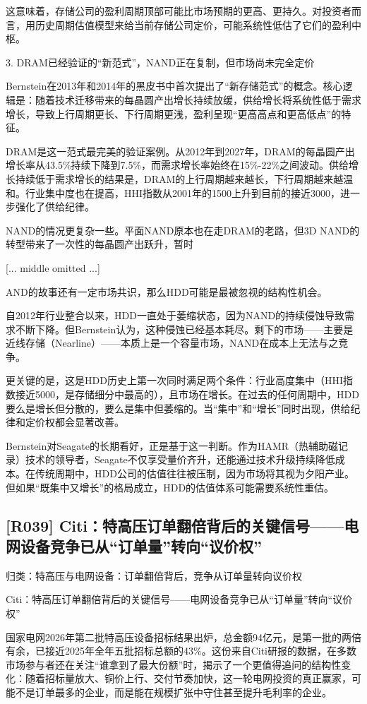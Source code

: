 \documentclass[11pt]{ctexart}
\begin{document}
这意味着，存储公司的盈利周期顶部可能比市场预期的更高、更持久。对投资者而言，用历史周期估值模型来给当前存储公司定价，可能系统性低估了它们的盈利中枢。

3. DRAM已经验证的“新范式”，NAND正在复制，但市场尚未完全定价

Bernstein在2013年和2014年的黑皮书中首次提出了“新存储范式”的概念。核心逻辑是：随着技术迁移带来的每晶圆产出增长持续放缓，供给增长将系统性低于需求增长，导致上行周期更长、下行周期更浅，盈利呈现“更高高点和更高低点”的特征。

DRAM是这一范式最完美的验证案例。从2012年到2027年，DRAM的每晶圆产出增长率从43.5\%持续下降到7.5\%，而需求增长率始终在15\%-22\%之间波动。供给增长持续低于需求增长的结果是，DRAM的上行周期越来越长，下行周期越来越温和。行业集中度也在提高，HHI指数从2001年的1500上升到目前的接近3000，进一步强化了供给纪律。

NAND的情况更复杂一些。平面NAND原本也在走DRAM的老路，但3D NAND的转型带来了一次性的每晶圆产出跃升，暂时

[... middle omitted ...]

AND的故事还有一定市场共识，那么HDD可能是最被忽视的结构性机会。

自2012年行业整合以来，HDD一直处于萎缩状态，因为NAND的持续侵蚀导致需求不断下降。但Bernstein认为，这种侵蚀已经基本耗尽。剩下的市场——主要是近线存储（Nearline）——本质上是一个容量市场，NAND在成本上无法与之竞争。

更关键的是，这是HDD历史上第一次同时满足两个条件：行业高度集中（HHI指数接近5000，是存储细分中最高的），且市场在增长。在过去的任何周期中，HDD要么是增长但分散的，要么是集中但萎缩的。当“集中”和“增长”同时出现，供给纪律和定价权都会显著改善。

Bernstein对Seagate的长期看好，正是基于这一判断。作为HAMR（热辅助磁记录）技术的领导者，Seagate不仅享受量价齐升，还能通过技术升级持续降低成本。在传统周期中，HDD公司的估值往往被压制，因为市场将其视为夕阳产业。但如果“既集中又增长”的格局成立，HDD的估值体系可能需要系统性重估。

\subsection{[R039] Citi：特高压订单翻倍背后的关键信号——电网设备竞争已从“订单量”转向“议价权”}
{\small\color{refgray}归类：特高压与电网设备：订单翻倍背后，竞争从订单量转向议价权}

Citi：特高压订单翻倍背后的关键信号——电网设备竞争已从“订单量”转向“议价权”

国家电网2026年第二批特高压设备招标结果出炉，总金额94亿元，是第一批的两倍有余，已接近2025年全年五批招标总额的43\%。这份来自Citi研报的数据，在多数市场参与者还在关注“谁拿到了最大份额”时，揭示了一个更值得追问的结构性变化：随着招标量放大、铜价上行、交付节奏加快，这一轮电网投资的真正赢家，可能不是订单最多的企业，而是能在规模扩张中守住甚至提升毛利率的企业。
\end{document}
